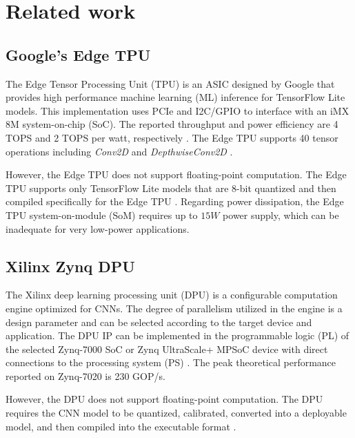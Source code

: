 \section{Related work}
\label{sec:related_work}
\subsection{Google's Edge TPU}

The Edge Tensor Processing Unit (TPU) is an ASIC designed by Google that provides high performance machine learning (ML) inference for TensorFlow Lite models\cite{yazdanbakhsh2021evaluation}. This implementation uses PCIe and I2C/GPIO to interface with an iMX 8M system-on-chip (SoC). The reported throughput and power efficiency are 4 TOPS and 2 TOPS per watt, respectively \cite{coral2021Datasheet}. The Edge TPU supports 40 tensor operations including \emph{Conv2D} and \emph{DepthwiseConv2D} \cite{coral2021Compatibility}.

However, the Edge TPU  does not support floating-point computation. The Edge TPU supports only TensorFlow Lite models that are 8-bit quantized and then compiled specifically for the Edge TPU \cite{cass2019taking}. Regarding power dissipation, the Edge TPU system-on-module (SoM) requires up to $15W$ power supply\cite{coral2021Datasheet}, which can be inadequate for very low-power applications.

\subsection{Xilinx Zynq DPU}
The Xilinx deep learning processing unit (DPU) is a configurable computation engine optimized for CNNs. The degree of parallelism utilized in the engine is a design parameter and can be selected according to the target device and application. The DPU IP can be implemented in the programmable logic (PL) of the selected Zynq-7000 SoC or Zynq UltraScale+ MPSoC device with direct connections to the processing system (PS) \cite{xilinxDPU}. The peak theoretical performance reported on Zynq-7020 is 230 GOP/s.

However, the DPU does not support floating-point computation. The DPU requires the CNN model to be quantized, calibrated, converted into a deployable model, and then compiled into the executable format \cite{xilinxDPU}.